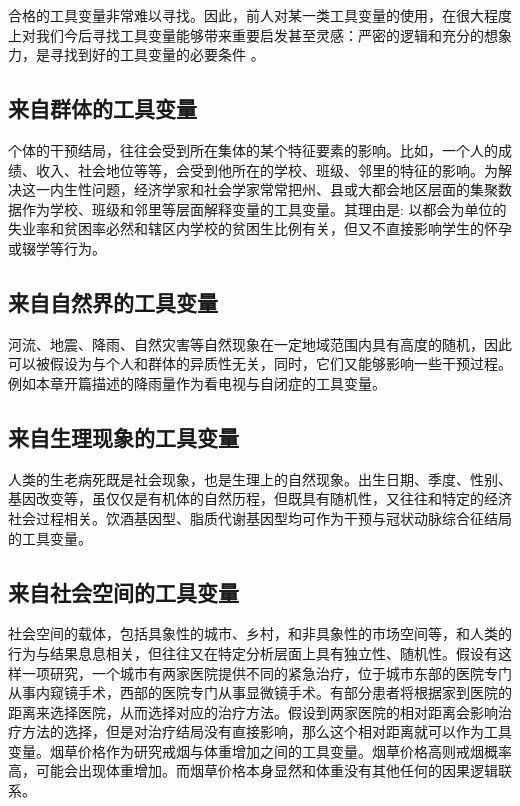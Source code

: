 \documentclass[
  chinese-hans,
  letterpaper,
  DIV=11,
  numbers=noendperiod]{scrreprt}
\begin{document}
合格的工具变量非常难以寻找。因此，前人对某一类工具变量的使用，在很大程度上对我们今后寻找工具变量能够带来重要启发甚至灵感：严密的逻辑和充分的想象力，是寻找到好的工具变量的必要条件
。

\subsection{来自群体的工具变量}\label{ux6765ux81eaux7fa4ux4f53ux7684ux5de5ux5177ux53d8ux91cf}

个体的干预结局，往往会受到所在集体的某个特征要素的影响。比如，一个人的成绩、收入、社会地位等等，会受到他所在的学校、班级、邻里的特征的影响。为解决这一内生性问题，经济学家和社会学家常常把州、县或大都会地区层面的集聚数据作为学校、班级和邻里等层面解释变量的工具变量。其理由是:
以都会为单位的失业率和贫困率必然和辖区内学校的贫困生比例有关，但又不直接影响学生的怀孕或辍学等行为。

\subsection{来自自然界的工具变量}\label{ux6765ux81eaux81eaux7136ux754cux7684ux5de5ux5177ux53d8ux91cf}

河流、地震、降雨、自然灾害等自然现象在一定地域范围内具有高度的随机，因此可以被假设为与个人和群体的异质性无关，同时，它们又能够影响一些干预过程。例如本章开篇描述的降雨量作为看电视与自闭症的工具变量。

\subsection{来自生理现象的工具变量}\label{ux6765ux81eaux751fux7406ux73b0ux8c61ux7684ux5de5ux5177ux53d8ux91cf}

人类的生老病死既是社会现象，也是生理上的自然现象。出生日期、季度、性别、基因改变等，虽仅仅是有机体的自然历程，但既具有随机性，又往往和特定的经济社会过程相关。饮酒基因型、脂质代谢基因型均可作为干预与冠状动脉综合征结局的工具变量。

\subsection{来自社会空间的工具变量}\label{ux6765ux81eaux793eux4f1aux7a7aux95f4ux7684ux5de5ux5177ux53d8ux91cf}

社会空间的载体，包括具象性的城市、乡村，和非具象性的市场空间等，和人类的行为与结果息息相关，但往往又在特定分析层面上具有独立性、随机性。假设有这样一项研究，一个城市有两家医院提供不同的紧急治疗，位于城市东部的医院专门从事内窥镜手术，西部的医院专门从事显微镜手术。有部分患者将根据家到医院的距离来选择医院，从而选择对应的治疗方法。假设到两家医院的相对距离会影响治疗方法的选择，但是对治疗结局没有直接影响，那么这个相对距离就可以作为工具变量。烟草价格作为研究戒烟与体重增加之间的工具变量。烟草价格高则戒烟概率高，可能会出现体重增加。而烟草价格本身显然和体重没有其他任何的因果逻辑联系。
\end{document}
